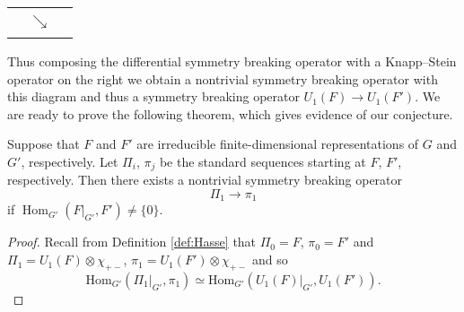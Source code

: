 \begin{center}
	\begin{tabular}{c@{\kern.7em}c@{\kern.7em}c}
		\blueO &  & \magentaO \\
		& $\searrow$ & \\
		\redO & & \greenO
	\end{tabular}
\end{center}


Thus composing the differential symmetry breaking operator
 with a Knapp--Stein operator
 on the right
 we obtain a nontrivial symmetry breaking operator with this diagram
and thus a symmetry breaking operator  $U_1(F) \rightarrow  U_1(F')$.
We are ready to prove the following theorem,
 which gives evidence of our conjecture.  

\medskip


\begin{theorem}
Suppose that $F$ and $F'$ are irreducible finite-dimensional representations
 of $G$ and $G'$, 
 respectively.  
Let $\Pi_i$, $\pi_j$ be the standard sequences starting at $F$, $F'$, 
respectively.  
Then there exists a nontrivial symmetry breaking operator 
\[
   \Pi_1 \rightarrow \pi_1  
\]
 if ${\operatorname{Hom}}_{G'}(F|_{G'}, F')\ne \{0\}$.  
\end{theorem}
\begin{proof}
Recall from Definition \ref{def:Hasse}
 that  $\Pi_0= F$,  $\pi_0= F'$
 and $\Pi_1 = U_1(F) \otimes \chi_{+-}$,
 $\pi_1 = U_1(F') \otimes \chi_{+-}$
 and so 
\[ \mbox{Hom}_{G'}( \Pi_1|_{G'} , \pi_1)
\simeq \mbox{Hom}_{G'}(U_1(F)|_{G'}, U_1(F')).
\]
\end{proof}



